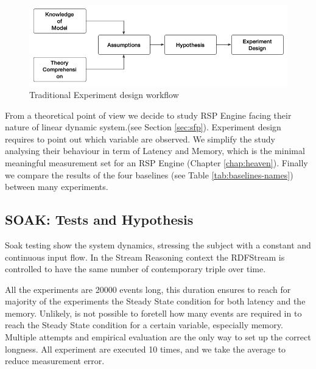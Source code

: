 \begin{figure}[tbh]
  \centering
	\includegraphics[width=\linewidth]{images/experiment-design}
	\caption{Traditional Experiment design workflow} 
  	\label{fig:experiment-design}
\end{figure}


From a theoretical point of view we decide to study RSP Engine facing their nature of linear dynamic system.(see Section \ref{sec:sfp}). Experiment design requires to point out which variable are observed. We simplify the study analysing their behaviour in term of Latency and Memory, which is the minimal meaningful measurement set for an RSP Engine (Chapter \ref{chap:heaven}). Finally we compare the results of the four baselines (see Table \ref{tab:baselines-names}) between many experiments.

\subsection{SOAK: Tests and Hypothesis}\label{sec:soak-es}

Soak testing show the system dynamics, stressing the subject with a constant and continuous input flow. In the Stream Reasoning context the RDFStream is controlled to have the same number of contemporary triple over time. 

All the experiments are 20000 events long, this duration ensures to reach for majority of the experiments the Steady State condition for both latency and the memory. Unlikely, is not possible to foretell how many events are required in to reach the Steady State condition for a certain variable, especially memory. Multiple attempts and empirical evaluation are the only way to set up the correct longness. All experiment are executed 10 times, and we take the average to reduce measurement error. 

